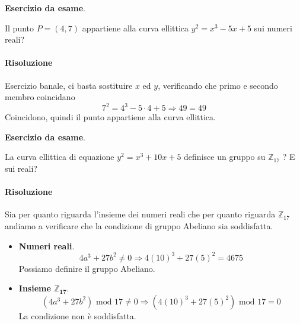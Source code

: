 \clearpage 
\begin{framed}
	\noindent \textbf{Esercizio da esame}.
	
	\noindent Il punto $P = (4, 7)$ appartiene alla curva ellittica $y^2	= x^3-5x + 5$ sui numeri reali?
	
	\paragraph{Risoluzione} Esercizio banale, ci basta sostituire $x$ ed $y$, verificando che primo e secondo membro coincidano
	$$7^2=4^3-5 \cdot 4+5 \Longrightarrow 49=49$$
	Coincidono, quindi il punto appartiene alla curva ellittica.
\end{framed} 


\begin{framed}
	\noindent \textbf{Esercizio da esame}.
	
	\noindent La curva ellittica di equazione $y^2=x^3+10x+5$ definisce un gruppo su $\mathbb{Z}_{17}$ ? E sui reali?
	
	\paragraph{Risoluzione} Sia per quanto riguarda l'insieme dei numeri reali che per quanto riguarda $\mathbb{Z}_{17}$ andiamo a verificare che la condizione di gruppo Abeliano sia soddisfatta.
	\begin{itemize}
		\item \textbf{Numeri reali}.
		$$4a^3+27b^2 \neq 0 \Longrightarrow 4(10)^3+27(5)^2=4675$$
		Possiamo definire il gruppo Abeliano.
		\item \textbf{Insieme $\mathbf{\mathbb{Z}_{17}}$}.
		$$(4a^3+27b^2) \text{ mod } 17 \neq 0 \Longrightarrow (4(10)^3+27(5)^2) \text{ mod } 17=0$$
		La condizione non è soddisfatta.
	\end{itemize}
\end{framed} 

